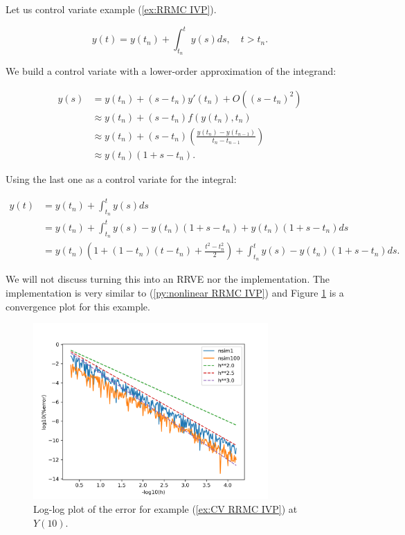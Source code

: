 \documentclass[a4paper,12pt]{article}
\begin{document}
\begin{example}[CV RRMC $y'=y$]\label{ex:CV RRMC IVP}
    Let us control variate example (\ref{ex:RRMC IVP}).

    \begin{equation}
        y(t)= y(t_{n}) + \int_{t_{n}}^{t}y(s)ds , \quad t>t_{n}.
    \end{equation}

    We build a control variate with a lower-order approximation
    of the integrand:

    \begin{align}
        y(s) & = y(t_{n}) + (s-t_{n})y'(t_{n}) + O((s-t_{n})^{2})       \\
             & \approx y(t_{n}) + (s-t_{n})f(y(t_{n}),t_{n})            \\
             & \approx y(t_{n}) +
        (s-t_{n})\left(\frac{y(t_{n})-y(t_{n-1})}{t_{n}-t_{n-1}}\right) \\
             & \approx y(t_{n})(1+s-t_{n}).
    \end{align}

    Using the last one as a control variate for the integral:

    \begin{align}
        y(t) & = y(t_{n}) + \int_{t_{n}}^{t}y(s)ds                                          \\
             & = y(t_{n}) + \int_{t_{n}}^{t}y(s)-y(t_{n})(1+s-t_{n}) +y(t_{n})(1+s-t_{n})ds \\
             & = y(t_{n})\left(1 + (1-t_{n})(t-t_{n})+\frac{t^{2}-t_{n}^{2}}{2}\right)
        + \int_{t_{n}}^{t}y(s)-y(t_{n})(1+s-t_{n})ds.
    \end{align}

    We will not discuss turning this into an RRVE nor the implementation.
    The implementation is very similar to (\ref{py:nonlinear RRMC IVP}) and
    Figure \ref{fig:CV RRMC IVP} is a convergence plot for this example.

    \begin{figure}[h!]
        \centering
        \includegraphics[width=0.8\textwidth]{plots/CV RRMC IVP.png}
        \caption{Log-log plot of the error for example
            (\ref{ex:CV RRMC IVP}) at $Y(10)$.}
        \label{fig:CV RRMC IVP}
    \end{figure}
\end{example}
\end{document}
